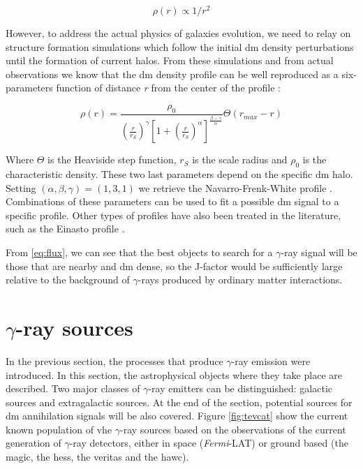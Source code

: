 \documentclass[main.tex]{subfiles}
\begin{document}
\begin{equation}
    \rho(r) \propto 1/r^2
\end{equation}

However, to address the actual physics of galaxies evolution, we need to relay on structure formation simulations which follow the initial \gls{dm} density perturbations until the formation of current halos. From these simulations and from actual observations \cite{1998Krav} we know that the \gls{dm} density profile can be well reproduced as a six-parameters function of distance \textit{r} from the center of the profile \cite{1990Hern}\cite{1996Zhao}\cite{1998Krav}:

\begin{equation}
    \rho(r) = \frac{\rho_{0}}{\left(\frac{r}{r_{S}}\right)^{\gamma}\left[ 1+\left(\frac{r}{r_{S}} \right)^{\alpha}\right]^{\frac{\beta-\gamma}{\alpha}}}\Theta(r_{max}-r)
\end{equation}

Where $\Theta$ is the Heaviside step function, $r_{S}$ is the scale radius and $\rho_{0}$ is the characteristic density. These two last parameters depend on the specific \gls{dm} halo. Setting $(\alpha,\beta,\gamma) = (1,3,1)$ we retrieve the Navarro-Frenk-White profile \cite{NFW}. Combinations of these parameters can be used to fit a possible \gls{dm} signal to a specific profile. Other types of profiles have also been treated in the literature, such as the Einasto profile \cite{1965Einasto}.

From \ref{eq:flux}, we can see that the best objects to search for a $\gamma$-ray signal will be those that are nearby and \gls{dm} dense, so the J-factor would be sufficiently large relative to the background of $\gamma$-rays produced by ordinary matter interactions. 

\section{$\gamma$-ray sources} \label{sec:gammasources}

In the previous section, the processes that produce $\gamma$-ray emission were introduced. In this section, the astrophysical objects where they take place are described. Two major classes of $\gamma$-ray emitters can be distinguished: galactic sources and extragalactic sources. At the end of the section, potential sources for \gls{dm} annihilation signals will be also covered. 
Figure \ref{fig:tevcat} show the current known population of \gls{vhe} $\gamma$-ray sources based on the observations of the current generation of $\gamma$-ray detectors, either in space (\textit{Fermi}-LAT) or ground based (the \gls{magic}, the \gls{hess}, the \gls{veritas} and the \gls{hawc}).  
\end{document}
